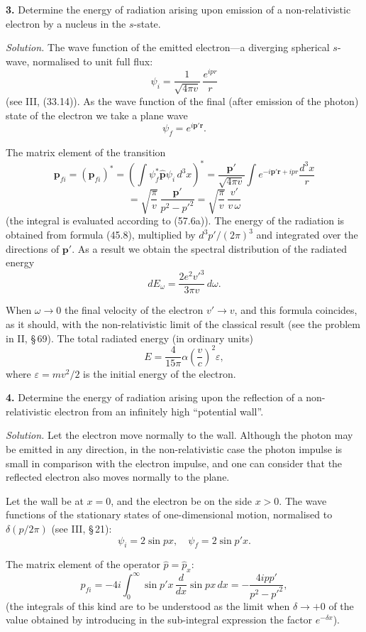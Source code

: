 
\textbf{3.} Determine the energy of radiation arising upon emission of a non-relativistic electron by a nucleus in the $s$-state.

\emph{Solution.} The wave function of the emitted electron---a diverging spherical $s$-wave, normalised to unit full flux:
\[
\psi_i = \frac{1}{\sqrt{4\pi v}}\,\frac{e^{ipr}}{r}
\]
(see III, (33.14)). As the wave function of the final (after emission of the photon) state of the electron we take a plane wave
\[
\psi_f = e^{i\mathbf{p}'\mathbf{r}}.
\]

The matrix element of the transition
\[
\mathbf{p}_{fi} = (\mathbf{p}_{fi})^* = \left(\int \psi_f^*\hat{\mathbf{p}}\psi_i\,d^3x\right)^{\!*} = \frac{\mathbf{p}'}{\sqrt{4\pi v}}\int e^{-i\mathbf{p}'\mathbf{r} + ipr}\frac{d^3x}{r}
\]
\[
= \sqrt{\frac{\pi}{v}}\,\frac{\mathbf{p}'}{p^2 - p'^2} = \sqrt{\frac{\pi}{v}}\,\frac{v'}{v\,\omega}
\]
(the integral is evaluated according to (57.6a)). The energy of the radiation is obtained from formula (45.8), multiplied by $d^3p'/(2\pi)^3$ and integrated over the directions of $\mathbf{p}'$. As a result we obtain the spectral distribution of the radiated energy
\[
dE_\omega = \frac{2e^2 v'^3}{3\pi v}\,d\omega.
\]

When $\omega \to 0$ the final velocity of the electron $v' \to v$, and this formula coincides, as it should, with the non-relativistic limit of the classical result (see the problem in II, \S\,69). The total radiated energy (in ordinary units)
\[
E = \frac{4}{15\pi}\alpha\left(\frac{v}{c}\right)^{\!2}\varepsilon,
\]
where $\varepsilon = mv^2/2$ is the initial energy of the electron.

\textbf{4.} Determine the energy of radiation arising upon the reflection of a non-relativistic electron from an infinitely high ``potential wall''.

\emph{Solution.} Let the electron move normally to the wall. Although the photon may be emitted in any direction, in the non-relativistic case the photon impulse is small in comparison with the electron impulse, and one can consider that the reflected electron also moves normally to the plane.

Let the wall be at $x = 0$, and the electron be on the side $x > 0$. The wave functions of the stationary states of one-dimensional motion, normalised to $\delta(p/2\pi)$ (see III, \S\,21):
\[
\psi_i = 2\sin px, \quad \psi_f = 2\sin p'x.
\]

The matrix element of the operator $\hat{p} = \hat{p}_x$:
\[
p_{fi} = -4i\int_0^\infty \sin p'x\,\frac{d}{dx}\sin px\,dx = -\frac{4ipp'}{p^2 - p'^2},
\]
(the integrals of this kind are to be understood as the limit when $\delta \to +0$ of the value obtained by introducing in the sub-integral expression the factor $e^{-\delta x}$).

